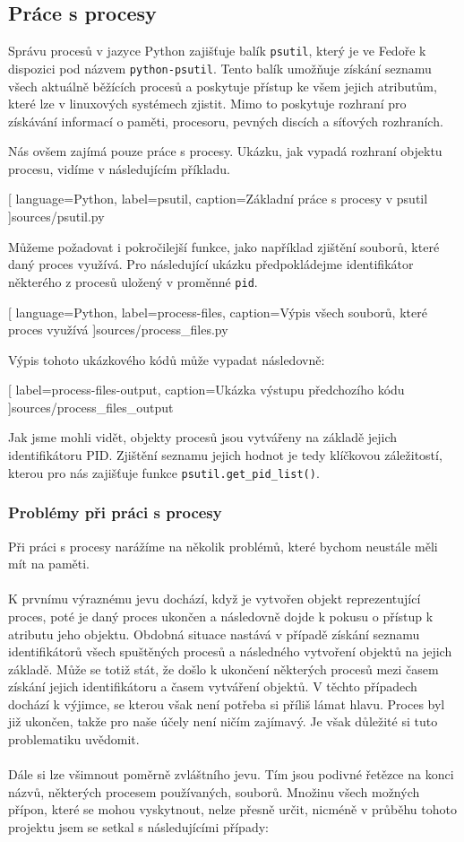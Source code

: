 \documentclass[10pt,a4paper]{article}
\begin{document}
		\subsection{Práce s procesy}
		Správu procesů v jazyce Python zajišťuje balík \texttt{psutil}, který je ve Fedoře k dispozici pod názvem \texttt{python-psutil}. Tento balík umožňuje získání seznamu všech aktuálně běžících procesů a poskytuje přístup ke všem jejich atributům, které lze v linuxových systémech zjistit. Mimo to poskytuje rozhraní pro získávání informací o paměti, procesoru, pevných discích a síťových rozhraních.

		Nás ovšem zajímá pouze práce s procesy. Ukázku, jak vypadá rozhraní objektu procesu, vidíme v následujícím příkladu.

		
		[
			language={Python},
			label=psutil,
			caption={Základní práce s procesy v psutil}
		]{sources/psutil.py}

		Můžeme požadovat i pokročilejší funkce, jako například zjištění souborů, které daný proces využívá. Pro následující ukázku předpokládejme identifikátor některého z procesů uložený v proměnné \texttt{pid}.

		
		[
			language={Python},
			label=process-files,
			caption={Výpis všech souborů, které proces využívá}
		]{sources/process_files.py}

		Výpis tohoto ukázkového kódů může vypadat následovně:

		
		[
			label=process-files-output,
			caption={Ukázka výstupu předchozího kódu}
		]{sources/process_files_output}

		Jak jsme mohli vidět, objekty procesů jsou vytvářeny na základě jejich identifikátoru PID\@. Zjištění seznamu jejich hodnot je tedy klíčkovou záležitostí, kterou pro nás zajišťuje funkce \texttt{psutil.get\_pid\_list()}.

		\subsubsection{Problémy při práci s procesy}
			Při práci s procesy narážíme na několik problémů, které bychom neustále měli mít na paměti.
			\\
			\\
			K prvnímu výraznému jevu dochází, když je vytvořen objekt reprezentující proces, poté je daný proces ukončen a následovně dojde k pokusu o přístup k atributu jeho objektu. Obdobná situace nastává v případě získání seznamu identifikátorů všech spuštěných procesů a následného vytvoření objektů na jejich základě. Může se totiž stát, že došlo k ukončení některých procesů mezi časem získání jejich identifikátoru a časem vytváření objektů. V těchto případech dochází k výjimce, se kterou však není potřeba si příliš lámat hlavu. Proces byl již ukončen, takže pro naše účely není ničím zajímavý. Je však důležité si tuto problematiku uvědomit.
			\\
			\\
			Dále si lze všimnout poměrně zvláštního jevu. Tím jsou podivné řetězce na konci názvů, některých procesem používaných, souborů. Množinu všech možných přípon, které se mohou vyskytnout, nelze přesně určit, nicméně v průběhu tohoto projektu jsem se setkal s následujícími případy:
\end{document}
